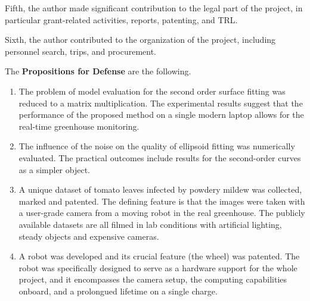 Fifth, the author made significant contribution to the legal part of the project, in particular grant-related activities, reports, patenting, and TRL.

Sixth, the author contributed to the organization of the project, including personnel search, trips, and procurement.


The \textbf{Propositions for Defense} are the following.

\begin{enumerate}
    \item The problem of model evaluation for the second order surface fitting was reduced to a matrix multiplication. The experimental results suggest that the performance of the proposed method on a single modern laptop allows for the real-time greenhouse monitoring.
    \item The influence of the noise on the quality of ellipsoid fitting was numerically evaluated. The practical outcomes include results for the second-order curves as a simpler object.
    \item A unique dataset of tomato leaves infected by powdery mildew was collected, marked and patented. The defining feature is that the images were taken with a user-grade camera from a moving robot in the real greenhouse. The publicly available datasets are all filmed in lab conditions with artificial lighting, steady objects and expensive cameras.
    \item A robot was developed and its crucial feature (the wheel) was patented. The robot was specifically designed to serve as a hardware support for the whole project, and it encompasses the camera setup, the computing capabilities onboard, and a prolongued lifetime on a single charge.
\end{enumerate}


